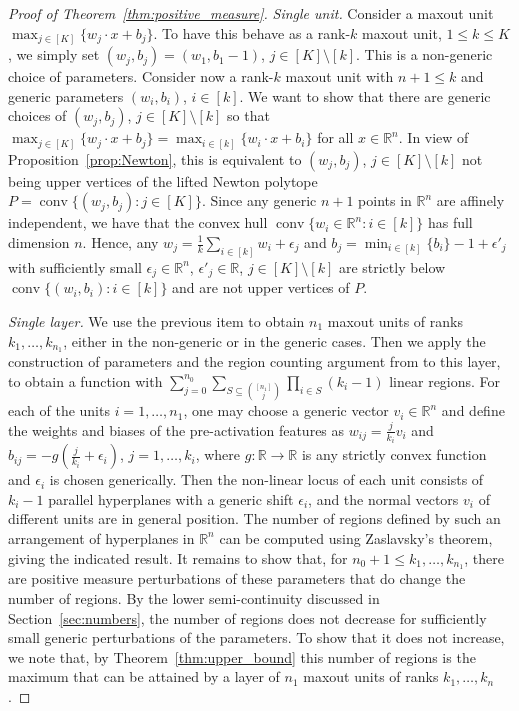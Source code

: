 \documentclass{article}
\theoremstyle{definition}
\newcommand{\conv}{\operatorname{conv}}
\begin{document}
\begin{proof}[Proof of Theorem~\ref{thm:positive_measure}] 
\emph{Single unit.} 
Consider a maxout unit $\max_{j\in[K]}\{w_j\cdot x + b_j\}$. 
To have this behave as a rank-$k$ maxout unit, $1\leq k\leq K$, we simply set $(w_j,b_j) = (w_1,b_1-1)$, $j\in[K]\setminus[k]$. This is a non-generic choice of parameters.
Consider now a rank-$k$ maxout unit with $n+1\leq k$ and generic parameters $(w_i,b_i)$, $i\in[k]$. 
We want to show that there are generic choices of $(w_j,b_j)$, $j\in[K]\setminus[k]$ so that $\max_{j\in[K]}\{w_j\cdot x + b_j\} = \max_{i\in[k]}\{w_i\cdot x + b_i\}$ for all $x\in\mathbb{R}^n$. 
In view of Proposition~\ref{prop:Newton}, this is equivalent to $(w_j,b_j)$, $j\in[K]\setminus[k]$ not being upper vertices of the lifted Newton polytope $P = \conv\{(w_j,b_j)\colon j\in [K]\}$. 
Since any generic $n+1$ points in $\mathbb{R}^n$ are affinely independent, we have that the convex hull $\conv\{w_i\in\mathbb{R}^n\colon i\in [k]\}$ has full dimension $n$. 
Hence, any $w_j = \frac{1}{k}\sum_{i\in[k]}w_i + \epsilon_j $ and $b_j = \min_{i\in[k]}\{b_i\}-1 + \epsilon'_j$ with sufficiently small $\epsilon_j\in \mathbb{R}^n$, $\epsilon'_j\in \mathbb{R}$, $j\in[K]\setminus[k]$ are strictly below $\conv\{(w_i,b_i)\colon i\in[k]\}$ and are not upper vertices of $P$. 

\emph{Single layer.} We use the previous item to obtain $n_1$ maxout units of ranks $k_1,\ldots, k_{n_1}$, either in the non-generic or in the generic cases.
Then we apply the construction of parameters and the region counting argument from \citet[Proposition~3.4]{sharp2021} to this layer, to obtain a function with $\sum_{j=0}^{n_0}\sum_{S\subseteq \binom{[n_1]}{j}} \prod_{i\in S}(k_i-1)$ linear regions.
For each of the units $i=1,\ldots, n_1$, one may choose a generic vector $v_i\in\mathbb{R}^n$ and define the weights and biases of the pre-activation features as $w_{ij} = \frac{j}{k_i} v_i$ and $b_{ij} = -g(\frac{j}{k_i}+\epsilon_i)$, $j=1,\ldots, k_i$, where $g\colon\mathbb{R}\to\mathbb{R}$ is any strictly convex function and $\epsilon_i$ is chosen generically.
Then the non-linear locus of each unit consists of $k_i-1$ parallel hyperplanes with a generic shift $\epsilon_i$, and the normal vectors $v_i$ of different units are in general position.
The number of regions defined by such an arrangement of hyperplanes in $\mathbb{R}^n$ can be computed using Zaslavsky's theorem, giving the indicated result.
It remains to show that, for $n_0+1\leq k_1,\ldots, k_{n_1}$, there are positive measure perturbations of these parameters that do change the number of regions. 
By the lower semi-continuity discussed in Section~\ref{sec:numbers}, the number of regions does not decrease for sufficiently small generic perturbations of the parameters. 
To show that it does not increase, we note that, by Theorem~\ref{thm:upper_bound} this number of regions is the maximum that can be attained by a layer of $n_1$ maxout units of ranks $k_1,\ldots, k_n$. 


\end{proof}
\end{document}
